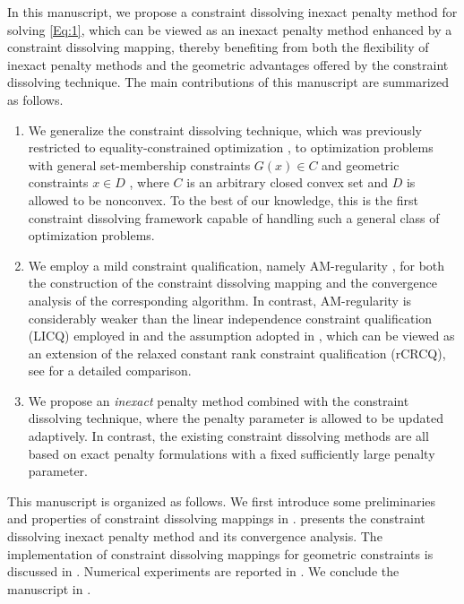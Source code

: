 \documentclass[11pt,a4paper,reqno]{amsart}
\begin{document}
{In this manuscript, we propose a constraint dissolving inexact penalty method for solving \eqref{Eq:1}, which can be viewed as an inexact penalty method enhanced by a constraint dissolving mapping, thereby benefiting from both the flexibility of inexact penalty methods and the geometric advantages offered by the constraint dissolving technique. The main contributions of this manuscript are summarized as follows. 
\begin{enumerate}
    \item We generalize the constraint dissolving technique, which was previously restricted to equality-constrained optimization \cite{hu2024constraint, xiao2024dissolving, xiao2026exact}, to optimization problems with general set-membership constraints $G(x)\in C$ and geometric constraints $x\in D$ , where $C$ is an arbitrary closed convex set and $D$ is allowed to be nonconvex. To the best of our knowledge, this is the first constraint dissolving framework capable of handling such a general class of optimization problems.
    \item We employ a mild constraint qualification, namely AM-regularity \cite{mehlitz2020asymptotic}, for both the construction of the constraint dissolving mapping and the convergence analysis of the corresponding algorithm. In contrast, AM-regularity is considerably weaker than the linear independence constraint qualification (LICQ) employed in \cite{xiao2024dissolving} and the assumption adopted in \cite[Assumption~1.1(2)]{xiao2026exact}, which can be viewed as an extension of the relaxed constant rank constraint qualification (rCRCQ), see  for a detailed comparison.
    \item We propose an \textit{inexact} penalty method combined with the constraint dissolving technique, where the penalty parameter is allowed to be updated adaptively. In contrast, the existing constraint dissolving methods \cite{hu2024constraint, xiao2024dissolving, xiao2026exact} are all based on exact penalty formulations with a fixed sufficiently large penalty parameter.
\end{enumerate}

This manuscript is organized as follows. We first introduce some preliminaries and properties of constraint dissolving mappings in .  presents the constraint dissolving inexact penalty method and its convergence analysis. The implementation of constraint dissolving mappings for geometric constraints is discussed in . Numerical experiments are reported in . We conclude the manuscript in .

}
\end{document}
